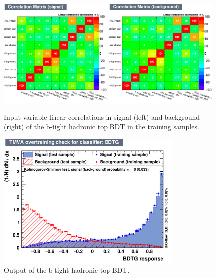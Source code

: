 \begin{figure}[hbtp]
 \begin{center}
   \includegraphics[width=0.49\textwidth]{ch8_figs/recoBdt_btight/CorrelationMatrixS.pdf}
   \includegraphics[width=0.49\textwidth]{ch8_figs/recoBdt_btight/CorrelationMatrixB.pdf}
   \caption[Input variable linear correlations of the b-tight hadronic top BDT]{Input variable linear correlations in signal (left) and background (right)
     of the b-tight hadronic top BDT in the training samples.}
   \label{fig:recoBdt_b_tight_corrMatrix}
 \end{center}
\end{figure}

\begin{figure}[hbtp]
 \begin{center}
   \includegraphics[width=0.8\textwidth]{ch8_figs/recoBdt_btight/overtrain_BDTG.pdf}
   \caption[Output of the b-tight hadronic top BDT]{Output of the b-tight hadronic top BDT.}
   \label{fig:recoBdt_btight_score}
 \end{center}
\end{figure}


